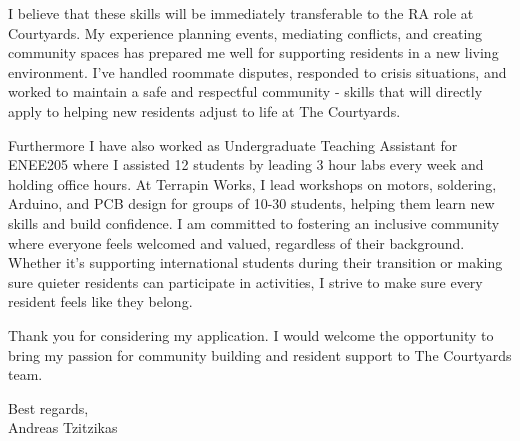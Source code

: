 \documentclass[10pt, letterpaper]{article}
\begin{document}
I believe that these skills will be immediately transferable to the RA role at Courtyards. My experience planning events, mediating conflicts, and creating community spaces has prepared me well for supporting residents in a new living environment. I've handled roommate disputes, responded to crisis situations, and worked to maintain a safe and respectful community - skills that will directly apply to helping new residents adjust to life at The Courtyards.

Furthermore I have also worked as Undergraduate Teaching Assistant for ENEE205 where I assisted 12 students by leading 3 hour labs every week and holding office hours. At Terrapin Works, I lead workshops on motors, soldering, Arduino, and PCB design for groups of 10-30 students, helping them learn new skills and build confidence. I am committed to fostering an inclusive community where everyone feels welcomed and valued, regardless of their background. Whether it's supporting international students during their transition or making sure quieter residents can participate in activities, I strive to make sure every resident feels like they belong.

Thank you for considering my application. I would welcome the opportunity to bring my passion for community building and resident support to The Courtyards team.

Best regards, \\
Andreas Tzitzikas
\end{document}
